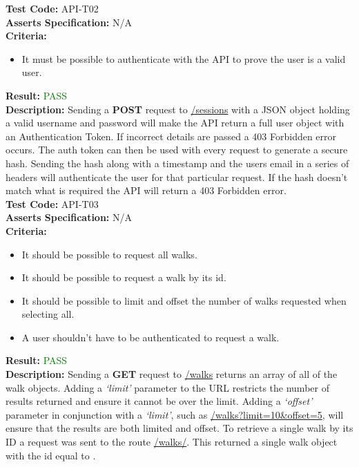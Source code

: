 \documentclass[11pt,a4paper]{report}
\begin{document}
\label{test:API-T02}
\noindent\textbf{Test Code:} API-T02\\
\textbf{Asserts Specification:} N/A \\ 
\textbf{Criteria:} \begin{itemize}
                     \item It must be possible to authenticate with the API to prove the user is a valid user. 
                   \end{itemize}  
\textbf{Result:} \textcolor{green}{PASS}\\ 
\textbf{Description:} Sending a \textbf{POST} request to \url{/sessions} with a JSON object holding a valid username and password will make the API return a full user object with an Authentication Token. If incorrect details are passed a 403 Forbidden error occurs. The auth token can then be used with every request to generate a secure hash. Sending the hash along with a timestamp and the users email in a series of headers will authenticate the user for that particular request. If the hash doesn't match what is required the API will return a 403 Forbidden error. \\ 

\label{test:API-T03}
\noindent\textbf{Test Code:} API-T03\\
\textbf{Asserts Specification:} N/A \\ 
\textbf{Criteria:} \begin{itemize}
                     \item It should be possible to request all walks.
                     \item It should be possible to request a walk by its id.
                     \item It should be possible to limit and offset the number of walks requested when selecting all.
                     \item A user shouldn't have to be authenticated to request a walk.
                   \end{itemize}  
\textbf{Result:} \textcolor{green}{PASS}\\ 
\textbf{Description:} Sending a \textbf{GET} request to \url{/walks} returns an array of all of the walk objects. Adding a \textit{`limit'} parameter to the URL restricts the number of results returned and ensure it cannot be over the limit. Adding a \textit{`offset'} parameter in conjunction with a \textit{`limit'}, such as \url{/walks?limit=10&offset=5}, will ensure that the results are both limited and offset. To retrieve a single walk by its ID a request was sent to the route \url{/walks/}. This returned a single walk object with the id equal to . \\ 
\end{document}
